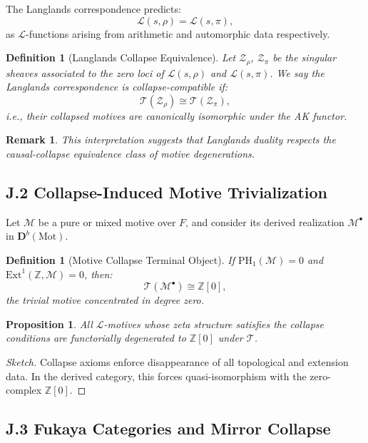 \documentclass[11pt]{article}
\newtheorem{definition}[theorem]{Definition}
\newtheorem{proposition}[theorem]{Proposition}
\newtheorem{remark}[theorem]{Remark}
\begin{document}
The Langlands correspondence predicts:
\[
\mathcal{L}(s, \rho) = \mathcal{L}(s, \pi),
\]
as $\mathcal{L}$-functions arising from arithmetic and automorphic data respectively.

\begin{definition}[Langlands Collapse Equivalence]
Let $\mathcal{Z}_\rho$, $\mathcal{Z}_\pi$ be the singular sheaves associated to the zero loci of $\mathcal{L}(s, \rho)$ and $\mathcal{L}(s, \pi)$.  
We say the Langlands correspondence is collapse-compatible if:
\[
\mathcal{T}(\mathcal{Z}_\rho) \cong \mathcal{T}(\mathcal{Z}_\pi),
\]
i.e., their collapsed motives are canonically isomorphic under the AK functor.
\end{definition}

\begin{remark}
This interpretation suggests that Langlands duality respects the causal-collapse equivalence class of motive degenerations.
\end{remark}

\subsection*{J.2 Collapse-Induced Motive Trivialization}

Let $\mathcal{M}$ be a pure or mixed motive over $F$, and consider its derived realization $\mathcal{M}^\bullet$ in $\mathbf{D}^b(\text{Mot})$.

\begin{definition}[Motive Collapse Terminal Object]
If $\mathrm{PH}_1(\mathcal{M}) = 0$ and $\mathrm{Ext}^1(\mathbb{Z}, \mathcal{M}) = 0$, then:
\[
\mathcal{T}(\mathcal{M}^\bullet) \cong \mathbb{Z}[0],
\]
the trivial motive concentrated in degree zero.
\end{definition}

\begin{proposition}
All $\mathcal{L}$-motives whose zeta structure satisfies the collapse conditions are functorially degenerated to $\mathbb{Z}[0]$ under $\mathcal{T}$.
\end{proposition}

\begin{proof}[Sketch]
Collapse axioms enforce disappearance of all topological and extension data.  
In the derived category, this forces quasi-isomorphism with the zero-complex $\mathbb{Z}[0]$.
\end{proof}

\subsection*{J.3 Fukaya Categories and Mirror Collapse}
\end{document}
